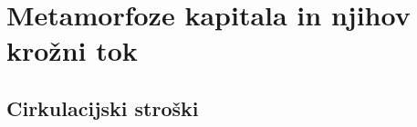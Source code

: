 \documentclass[egregdoesnotlikesansseriftitles, a5paper, BCOR=1cm, DIV=calc]{scrbook}
\begin{document}
% 

\part{Metamorfoze kapitala in njihov krožni tok}





    
    \chapter{Cirkulacijski stroški}
    



\end{document}
